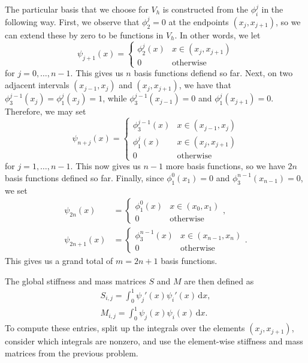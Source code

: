 \documentclass{article}
\theoremstyle{definition}
\theoremstyle{plain}
\theoremstyle{remark}
\renewcommand{\d}{\mathrm d}
\begin{document}
The particular basis that we choose for $V_h$ is constructed from the $\phi_i^j$ in the following way.
First, we observe that $\phi_2^j = 0$ at the endpoints $(x_j,x_{j+1})$, so we can extend these by zero to be functions in $V_h$.
In other words, we let
\begin{equation}
  \psi_{j+1}(x) = \begin{cases} \phi_2^j(x) & x \in (x_j,x_{j+1}) \\ 0 & \text{otherwise} \end{cases}
\end{equation}
for $j = 0,\dots,n-1$.
This gives us $n$ basis functions defiend so far.
Next, on two adjacent intervals $(x_{j-1},x_j)$ and $(x_j,x_{j+1})$, we have that $\phi_3^{j-1}(x_j) = \phi_1^j(x_j) = 1$, while $\phi_3^{j-1}(x_{j-1}) = 0$ and $\phi_1^j(x_{j+1}) = 0$.
Therefore, we may set 
\begin{equation}
  \psi_{n+j}(x) = \begin{cases} \phi_3^{j-1}(x) & x \in (x_{j-1},x_j) \\ \phi_1^j(x) & x \in (x_j,x_{j+1}) \\  0 & \text{otherwise} \end{cases}
\end{equation}
for $j = 1,\dots,n-1$.
This now gives us $n-1$ more basis functions, so we have $2n$ basis functions defined so far.
Finally, since $\phi_1^0(x_1) = 0$ and $\phi_3^{n-1}(x_{n-1}) = 0$, we set 
\begin{align}
  \psi_{2n}(x) & = \begin{cases} \phi_1^{0}(x) & x \in (x_0,x_1) \\  0 & \text{otherwise} \end{cases}, \\
  \psi_{2n+1}(x) & = \begin{cases} \phi_3^{n-1}(x) & x \in (x_{n-1},x_n) \\  0 & \text{otherwise} \end{cases}.
\end{align}
This gives us a grand total of $m = 2n+1$ basis functions.

The global stiffness and mass matrices $S$ and $M$ are then defined as 
\begin{align}
  S_{i,j} = \int_0^1\psi_j'(x)\psi_i'(x)\,\d x, \\
  M_{i,j} = \int_0^1\psi_j(x)\psi_i(x)\,\d x.
\end{align}
To compute these entries, split up the integrals over the elements $(x_j,x_{j+1})$, consider which integrals are nonzero, and use the element-wise stiffness and mass matrices from the previous problem.
\end{document}
